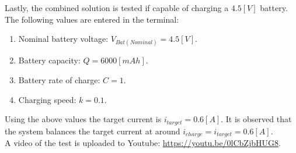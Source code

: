 \documentclass[../report.tex]{subfiles}
\begin{document}
Lastly, the combined solution is tested if capable of charging a $4.5 [V]$ battery. The following values are entered in the terminal:
\begin{enumerate}
    \item Nominal battery voltage: $V_{Bat(Nominal)} = 4.5 [V]$.
    \item Battery capacity: $Q = 6000 [mAh]$.
    \item Battery rate of charge: $C = 1$.
    \item Charging speed: $ k = 0.1$.
\end{enumerate}
Using the above values the target current is  $i_{target} = 0.6 [A]$. It is observed that the system balances the target current at around $i_{charge} = i_{target} = 0.6 [A]$.\\
A video of the test is uploaded to Youtube: \url{https://youtu.be/0lCbZjbHUG8}.
\end{document}
